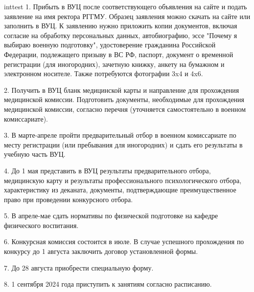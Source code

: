 \begin{longtbl}{inttest}
1. Прибыть в ВУЦ после соответствующего объявления на сайте и подать заявление на имя ректора РГГМУ. Образец заявления можно скачать на сайте или заполнить в ВУЦ. К заявлению нужно приложить копии документов, включая согласие на обработку персональных данных, автобиографию, эссе "Почему я выбираю военную подготовку", удостоверение гражданина Российской Федерации, подлежащего призыву в ВС РФ, паспорт, документ о временной регистрации (для иногородних), зачетную книжку, анкету на бумажном и электронном носителе. Также потребуются фотографии 3x4 и 4x6.

2. Получить в ВУЦ бланк медицинской карты и направление для прохождения медицинской комиссии. Подготовить документы, необходимые для прохождения медицинской комиссии, согласно перечня (уточняется самостоятельно в военном комиссариате).

3. В марте-апреле пройти предварительный отбор в военном комиссариате по месту регистрации (или пребывания для иногородних) и сдать его результаты в учебную часть ВУЦ.

4. До 1 мая представить в ВУЦ результаты предварительного отбора, медицинскую карту и результаты профессионального психологического отбора, характеристику из деканата, документы, подтверждающие преимущественное право при проведении конкурсного отбора.

5. В апреле-мае сдать нормативы по физической подготовке на кафедре физического воспитания.

6. Конкурсная комиссия состоится в июле. В случае успешного прохождения по конкурсу до 1 августа заключить договор установленной формы.

7. До 28 августа приобрести специальную форму.

8. 1 сентября 2024 года приступить к занятиям согласно расписанию.


\end{longtbl}
